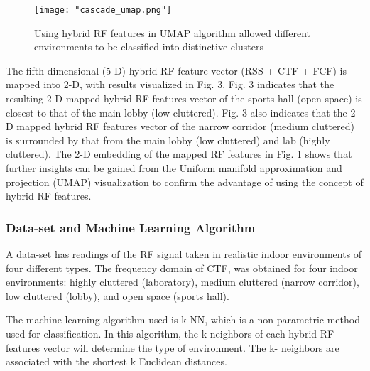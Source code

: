     	\begin{figure}[H]
    		\captionsetup{justification=centering}
    		\texttt{[image: "cascade\_umap.png"]}
    		\caption{Using hybrid RF features in UMAP algorithm allowed different environments to be classified into distinctive clusters \cite[Fig. 1]{cascade}}
    	\end{figure}
    
    The fifth-dimensional (5-D) hybrid RF feature vector (RSS + CTF + FCF) is mapped into 2-D, with results visualized in Fig. 3. Fig. 3 indicates that the resulting 2-D mapped hybrid RF features vector of the sports hall (open space) is closest to that of the main lobby (low cluttered). Fig. 3 also indicates that the 2-D mapped hybrid RF features vector of the narrow corridor (medium cluttered) is surrounded by that from the main lobby (low cluttered) and lab (highly cluttered). The 2-D embedding of the mapped RF features in Fig. 1 shows that further insights can be gained from the Uniform manifold approximation and projection (UMAP) visualization to confirm the advantage of using the concept of hybrid RF features.
    
    \subsubsection{Data-set and Machine Learning Algorithm}
    A data-set has readings of the RF signal taken in realistic indoor environments of four different types. The frequency domain of CTF, was obtained for four indoor environments: highly cluttered (laboratory), medium cluttered (narrow corridor), low cluttered (lobby), and open space (sports hall).
    
    The machine learning algorithm used is k-NN, which is a non-parametric method used for classification. In this algorithm, the k neighbors of each hybrid RF features vector will determine the type of environment. The k- neighbors are associated with the shortest k Euclidean distances.
    
